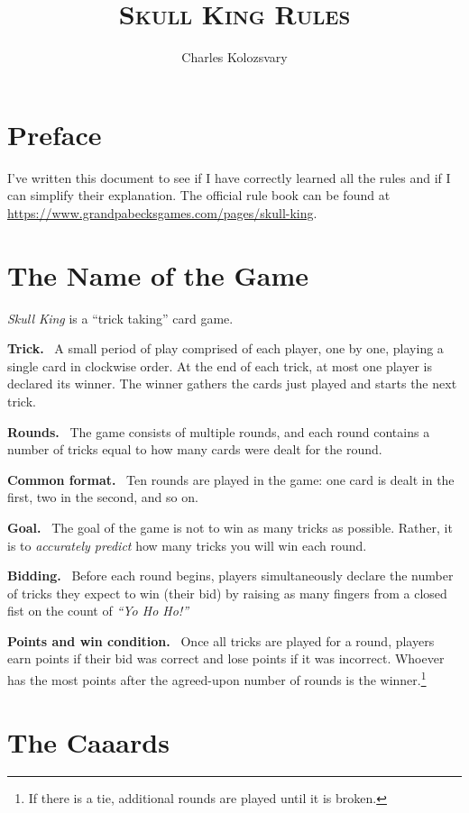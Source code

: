 \documentclass{article}
\title{\textsc{Skull King Rules}}
\author{Charles Kolozsvary}
\date{}
\newcommand{\block}[2][\medskip]{#1\noindent\textbf{#2.}\ }
\begin{document}
\maketitle

\section*{Preface}
I've written this document to see if I have correctly learned all the rules and if I can simplify their explanation.
The official rule book can be found at \url{https://www.grandpabecksgames.com/pages/skull-king}. 

\section{The Name of the Game}
\textit{Skull King} is a ``trick taking'' card game.

\block{Trick}
A small period of play comprised of each player, one by one, playing a single card in clockwise order. At the end of each trick, at most one player is declared its winner. The winner gathers the cards just played and starts the next trick.

\block{Rounds}
The game consists of multiple rounds, and each round contains a number of tricks equal to how many cards were dealt for the round. 

\block{Common format}
Ten rounds are played in the game: one card is dealt in the first, two in the second, and so on.

\block{Goal}
The goal of the game is not to win as many tricks as possible. Rather, it is to \textit{accurately predict} how many tricks you will win each round.

\block{Bidding}
Before each round begins, players simultaneously declare the number of tricks they expect to win (their bid)
by raising as many fingers from a closed fist on the count of \textit{``Yo Ho Ho!''}

\block{Points and win condition}
Once all tricks are played for a round, players
earn points if their bid was correct and lose points if it was incorrect. Whoever has the most points after the agreed-upon number of
rounds is the winner.\footnote{If there is a tie, additional rounds are played until it is broken.}

\section{The Caaards}
\end{document}
